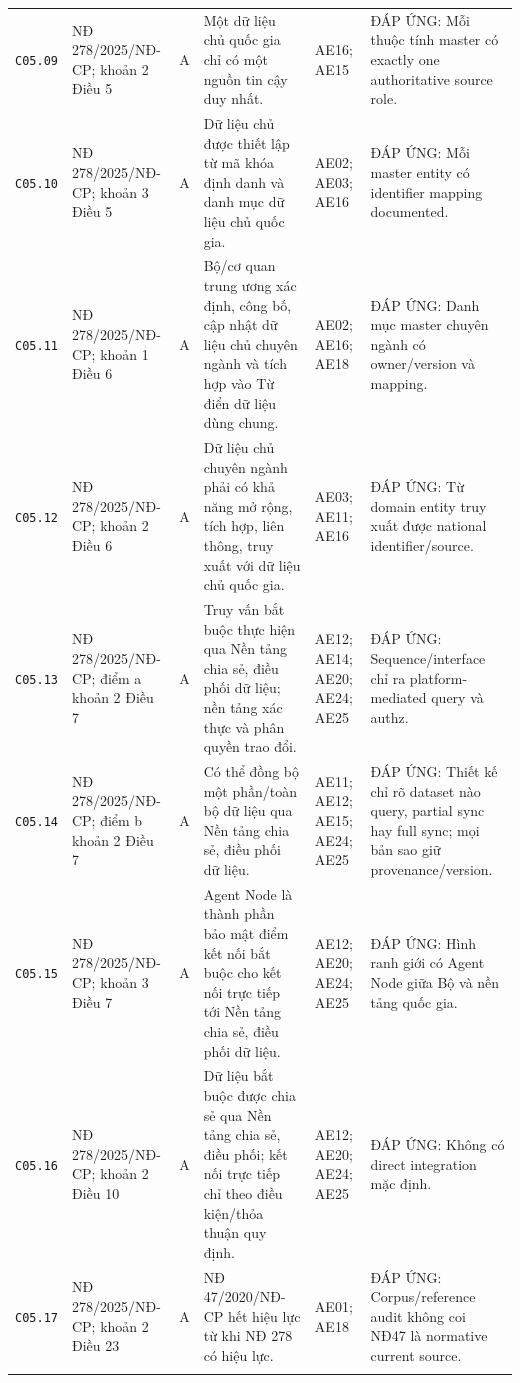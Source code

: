\begin{longtable}{@{}p{0.9cm}p{3.0cm}p{0.55cm}p{4.05cm}p{2.0cm}p{3.45cm}@{}}
\texttt{C05.09} & NĐ 278/2025/NĐ-CP; khoản 2 Điều 5 & A & Một dữ liệu chủ quốc gia chỉ có một nguồn tin cậy duy nhất. & AE16; AE15 & ĐÁP ỨNG: Mỗi thuộc tính master có exactly one authoritative source role. \\ \addlinespace[1pt]
\texttt{C05.10} & NĐ 278/2025/NĐ-CP; khoản 3 Điều 5 & A & Dữ liệu chủ được thiết lập từ mã khóa định danh và danh mục dữ liệu chủ quốc gia. & AE02; AE03; AE16 & ĐÁP ỨNG: Mỗi master entity có identifier mapping documented. \\ \addlinespace[1pt]
\texttt{C05.11} & NĐ 278/2025/NĐ-CP; khoản 1 Điều 6 & A & Bộ/cơ quan trung ương xác định, công bố, cập nhật dữ liệu chủ chuyên ngành và tích hợp vào Từ điển dữ liệu dùng chung. & AE02; AE16; AE18 & ĐÁP ỨNG: Danh mục master chuyên ngành có owner/version và mapping. \\ \addlinespace[1pt]
\texttt{C05.12} & NĐ 278/2025/NĐ-CP; khoản 2 Điều 6 & A & Dữ liệu chủ chuyên ngành phải có khả năng mở rộng, tích hợp, liên thông, truy xuất với dữ liệu chủ quốc gia. & AE03; AE11; AE16 & ĐÁP ỨNG: Từ domain entity truy xuất được national identifier/source. \\ \addlinespace[1pt]
\texttt{C05.13} & NĐ 278/2025/NĐ-CP; điểm a khoản 2 Điều 7 & A & Truy vấn bắt buộc thực hiện qua Nền tảng chia sẻ, điều phối dữ liệu; nền tảng xác thực và phân quyền trao đổi. & AE12; AE14; AE20; AE24; AE25 & ĐÁP ỨNG: Sequence/interface chỉ ra platform-mediated query và authz. \\ \addlinespace[1pt]
\texttt{C05.14} & NĐ 278/2025/NĐ-CP; điểm b khoản 2 Điều 7 & A & Có thể đồng bộ một phần/toàn bộ dữ liệu qua Nền tảng chia sẻ, điều phối dữ liệu. & AE11; AE12; AE15; AE24; AE25 & ĐÁP ỨNG: Thiết kế chỉ rõ dataset nào query, partial sync hay full sync; mọi bản sao giữ provenance/version. \\ \addlinespace[1pt]
\texttt{C05.15} & NĐ 278/2025/NĐ-CP; khoản 3 Điều 7 & A & Agent Node là thành phần bảo mật điểm kết nối bắt buộc cho kết nối trực tiếp tới Nền tảng chia sẻ, điều phối dữ liệu. & AE12; AE20; AE24; AE25 & ĐÁP ỨNG: Hình ranh giới có Agent Node giữa Bộ và nền tảng quốc gia. \\ \addlinespace[1pt]
\texttt{C05.16} & NĐ 278/2025/NĐ-CP; khoản 2 Điều 10 & A & Dữ liệu bắt buộc được chia sẻ qua Nền tảng chia sẻ, điều phối; kết nối trực tiếp chỉ theo điều kiện/thỏa thuận quy định. & AE12; AE20; AE24; AE25 & ĐÁP ỨNG: Không có direct integration mặc định. \\ \addlinespace[1pt]
\texttt{C05.17} & NĐ 278/2025/NĐ-CP; khoản 2 Điều 23 & A & NĐ 47/2020/NĐ-CP hết hiệu lực từ khi NĐ 278 có hiệu lực. & AE01; AE18 & ĐÁP ỨNG: Corpus/reference audit không coi NĐ47 là normative current source. \\ \addlinespace[1pt]

\end{longtable}
